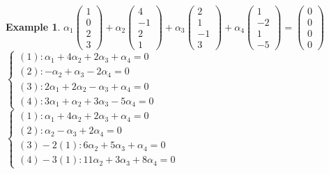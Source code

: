 \documentclass[a4paper, 10pt]{article}
\theoremstyle{theoremdd}
\theoremstyle{theoremdd}
\theoremstyle{theoremdd}
\theoremstyle{theoremdd}
\newtheorem{example}[theorem]{Example}
\theoremstyle{theoremdd}
\theoremstyle{theoremdd}
\theoremstyle{theoremdd}
\theoremstyle{theoremdd}
\begin{document}
\begin{example}
	$\alpha_1 \begin{pmatrix} 1\\ 0\\ 2\\ 3 \end{pmatrix} + \alpha_2 \begin{pmatrix} 4\\ -1\\ 2\\ 1 \end{pmatrix} + \alpha_3 \begin{pmatrix} 2\\ 1\\ -1\\ 3 \end{pmatrix} + \alpha_4 \begin{pmatrix} 1\\ -2\\ 1\\ -5 \end{pmatrix} = \begin{pmatrix} 0\\ 0\\ 0\\ 0 \end{pmatrix}$\\
	$\begin{cases}
	(1): \alpha_1 + 4\alpha_2 + 2\alpha_3 + \alpha_4 = 0\\
	(2): -\alpha_2 + \alpha_3 - 2\alpha_4 = 0\\
	(3): 2\alpha_1 + 2\alpha_2 - \alpha_3 + \alpha_4 = 0\\
	(4): 3\alpha_1 + \alpha_2 + 3\alpha_3 - 5\alpha_4 = 0
	\end{cases}$\\

	$\begin{cases}
	(1): \alpha_1 + 4\alpha_2 + 2\alpha_3 + \alpha_4 = 0\\
	(2): \alpha_2 - \alpha_3 + 2\alpha_4 = 0\\
	(3)-2(1): 6\alpha_2 + 5\alpha_3 + \alpha_4 = 0\\
	(4)-3(1): 11\alpha_2 + 3\alpha_3 + 8\alpha_4 = 0
	\end{cases}$\\
	

\end{example}
\end{document}
